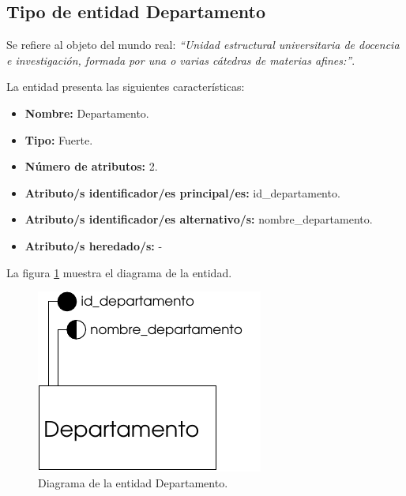 \subsection{Tipo de entidad Departamento}

   \begin{description}

   \item[Definición] Se refiere al objeto del mundo real: \emph{``Unidad
   estructural universitaria de docencia e investigación, formada por una o
   varias cátedras de materias afines:''}.

   \item[Características] La entidad presenta las siguientes características:
      \begin{itemize}
         \item \textbf{Nombre:} Departamento.
         \item \textbf{Tipo:} Fuerte.
         \item \textbf{Número de atributos:} 2.
         \item \textbf{Atributo/s identificador/es principal/es:} id\_departamento.
         \item \textbf{Atributo/s identificador/es alternativo/s:} nombre\_departamento.
         \item \textbf{Atributo/s heredado/s:} -
      \end{itemize}

   \item[Diagrama] La figura \ref{diagramaDepartamento} muestra el diagrama de la entidad.
   \item \begin{figure}[!ht]
            \begin{center}
            \includegraphics[]{07.Modelo_Entidad-Interrelacion/7.2.Analisis_Entidades/diagramas/departamento.pdf}
            \caption{Diagrama de la entidad Departamento.}
            \label{diagramaDepartamento}
            \end{center}
         \end{figure}


\end{description}
